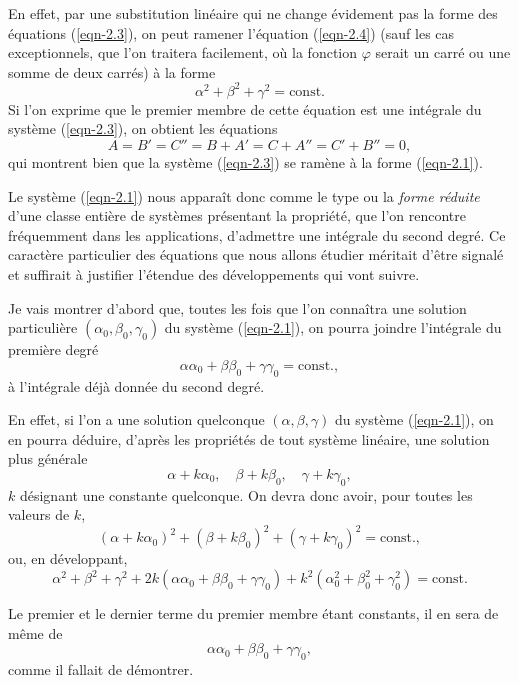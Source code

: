 En effet, par une substitution linéaire qui ne change évidement pas la forme des équations (\ref{eqn-2.3}), on peut 
ramener l'équation (\ref{eqn-2.4}) (sauf les cas exceptionnels, que l'on traitera facilement, où la fonction $\varphi$ 
serait un carré ou une somme de deux carrés) à la forme
\begin{equation}
\alpha^2 + \beta^2 + \gamma^2 = \textrm{const.}
\label{eqn-2.5}
\end{equation}
Si l'on exprime que le premier membre de cette équation est une intégrale du système (\ref{eqn-2.3}), on obtient les 
équations
\[
A = B' = C'' = B + A' = C + A'' = C' + B'' = 0,
\]
qui montrent bien que la système (\ref{eqn-2.3}) se ramène à la forme (\ref{eqn-2.1}).

Le système (\ref{eqn-2.1}) nous apparaît donc comme le type ou la \textit{forme réduite} d'une classe entière de 
systèmes présentant la propriété, que l'on rencontre fréquemment dans les applications, d'admettre une intégrale du 
second degré. Ce caractère particulier des équations que nous allons étudier méritait d'être signalé et suffirait à 
justifier l'étendue des développements qui vont suivre.

 Je vais montrer d'abord que, toutes les fois que l'on connaîtra une solution particulière $(\alpha_0, 
\beta_0, \gamma_0)$ du système (\ref{eqn-2.1}), on pourra joindre l'intégrale du première degré
\[
\alpha\alpha_0 + \beta\beta_0 + \gamma\gamma_0 = \textrm{const.},
\]
à l'intégrale déjà donnée du second degré.

En effet, si l'on a une solution quelconque $(\alpha, \beta, \gamma)$ du système (\ref{eqn-2.1}), on en pourra déduire, 
d'après les propriétés de tout système linéaire, une solution plus générale
\[
\alpha + k\alpha_0, \quad \beta + k\beta_0, \quad \gamma + k\gamma_0,
\]
$k$ désignant une constante quelconque. On devra donc avoir, pour toutes les valeurs de $k$,
\[
(\alpha + k\alpha_0)^2 + (\beta + k\beta_0)^2 + (\gamma + k\gamma_0)^2 = \textrm{const.},
\]
ou, en développant,
\[
\alpha^2 + \beta^2 + \gamma^2 + 2k(\alpha\alpha_0 + \beta\beta_0 + \gamma\gamma_0) + k^2(\alpha_0^2 + \beta_0^2 + 
\gamma_0^2) = \textrm{const.}
\]

Le premier et le dernier terme du premier membre étant constants, il en sera de même de
\[
\alpha\alpha_0 + \beta\beta_0 + \gamma\gamma_0,
\]
comme il fallait de démontrer.

